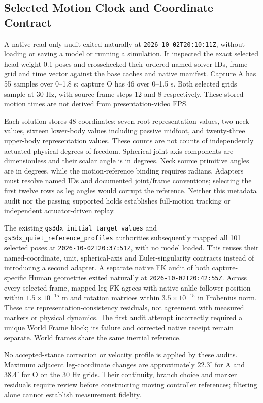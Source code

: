 \documentclass[11pt,a4paper]{article}
\begin{document}
\subsection{Selected Motion Clock and Coordinate Contract}
A native read-only audit exited naturally at
\texttt{2026-10-02T20:10:11Z}, without loading or saving a model or running
a simulation. It inspected the exact selected head-weight-0.1 poses and
crosschecked their ordered named solver IDs, frame grid and time vector
against the base caches and native manifest. Capture A has 55 samples over
0--1.8 s; capture O has 46 over 0--1.5 s. Both selected grids sample at
30 Hz, with source frame steps 12 and 8 respectively. These stored motion
times are not derived from presentation-video FPS.

Each solution stores 48 coordinates: seven root representation values,
two neck values, sixteen lower-body values including passive midfoot,
and twenty-three upper-body representation values. These counts are
not counts of independently actuated physical degrees of freedom.
Spherical-joint axis components are dimensionless and their scalar
angle is in degrees. Neck source primitive angles are in degrees, while
the motion-reference binding requires radians. Adapters must resolve
named IDs and documented joint/frame conventions; selecting the first
twelve rows as leg angles would corrupt the reference. Neither this
metadata audit nor the passing supported holds establishes full-motion
tracking or independent actuator-driven replay.

The existing \texttt{gs3dx\_initial\_target\_values} and
\texttt{gs3dx\_quiet\_reference\_profiles} authorities subsequently mapped
all 101 selected poses at \texttt{2026-10-02T20:37:51Z}, with no model
loaded. This reuses their named-coordinate, unit, spherical-axis and
Euler-singularity contracts instead of introducing a second adapter.
A separate native FK audit of both capture-specific Human geometries
exited naturally at \texttt{2026-10-02T20:42:55Z}. Across every selected
frame, mapped leg FK agrees with native ankle-follower position within
$1.5\times10^{-15}$ m and rotation matrices within
$3.5\times10^{-15}$ in Frobenius norm. These are representation-consistency
residuals, not agreement with measured markers or physical dynamics.
The first audit attempt incorrectly required a unique World Frame block;
its failure and corrected native receipt remain separate. World frames
share the same inertial reference.

No accepted-stance correction or velocity profile is applied by these
audits. Maximum adjacent leg-coordinate changes are approximately
$22.3^\circ$ for A and $38.4^\circ$ for O on the 30 Hz grids. Their
continuity, branch choice and marker residuals require review before
constructing moving controller references; filtering alone cannot
establish measurement fidelity.
\end{document}
